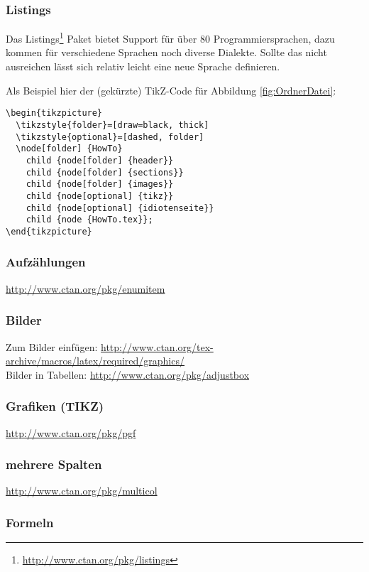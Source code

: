 \subsubsection{Listings}
Das Listings\footnote{\url{http://www.ctan.org/pkg/listings}} Paket bietet Support für über 80 Programmiersprachen, dazu kommen für verschiedene Sprachen noch diverse Dialekte. Sollte das nicht
ausreichen lässt sich relativ leicht eine neue Sprache definieren.

Als Beispiel hier der (gekürzte) TikZ-Code für Abbildung \ref{fig:OrdnerDatei}:
\begin{lstlisting}
\begin{tikzpicture}
  \tikzstyle{folder}=[draw=black, thick]
  \tikzstyle{optional}=[dashed, folder]
  \node[folder] {HowTo}
    child {node[folder] {header}}
    child {node[folder] {sections}}
    child {node[folder] {images}}
    child {node[optional] {tikz}}
    child {node[optional] {idiotenseite}}
    child {node {HowTo.tex}};
\end{tikzpicture}
\end{lstlisting}


\subsubsection{Aufzählungen}
\url{http://www.ctan.org/pkg/enumitem}

\subsubsection{Bilder}
Zum Bilder einfügen: \url{http://www.ctan.org/tex-archive/macros/latex/required/graphics/} \\
Bilder in Tabellen: \url{http://www.ctan.org/pkg/adjustbox}

\subsubsection{Grafiken (TIKZ)}
\url{http://www.ctan.org/pkg/pgf}

\subsubsection{mehrere Spalten}
\url{http://www.ctan.org/pkg/multicol}


\subsubsection{Formeln}
